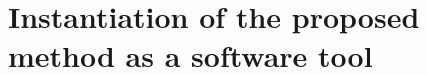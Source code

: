 


\section{Instantiation of the proposed method as a software tool}
\label{closing:development-software}

